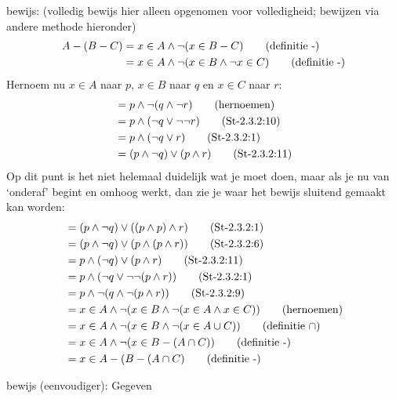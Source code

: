 \begin{answer}
\begin{enumerate}[label=\textit{\alph*.}]
    bewijs: (volledig bewijs hier alleen opgenomen voor volledigheid; bewijzen via andere methode hieronder)\\
    \begin{align}
    A - (B - C) &= x\in A\wedge \neg(x\in B-C)\tag{\text{definitie -}}\\
    &= x\in A\wedge\neg(x\in B\wedge\neg x\in C) \tag{\text{definitie -}}
    \end{align}
    Hernoem nu $x\in A$ naar $p$, $x\in B$ naar $q$ en $x\in C$ naar $r$:
    \begin{align}
    &= p\wedge\neg(q\wedge\neg r)\tag{\text{hernoemen}}\\
    &= p\wedge(\neg q\vee\neg\neg r)\tag{St-2.3.2:10}\\
    &= p\wedge(\neg q\vee r)\tag{St-2.3.2:1}\\
    &=(p\wedge\neg q)\vee(p\wedge r)\tag{St-2.3.2:11}\\
    \end{align}
    Op dit punt is het niet helemaal duidelijk wat je moet doen, maar als je nu van `onderaf' begint en omhoog werkt, dan zie je waar het bewijs sluitend gemaakt kan worden:
    \begin{align}
    &=(p\wedge\neg q)\vee((p\wedge p)\wedge r)\tag{St-2.3.2:1}\\
    &=(p\wedge\neg q)\vee(p\wedge (p\wedge r))\tag{St-2.3.2:6}\\
    &=p\wedge(\neg q)\vee(p\wedge r)\tag{St-2.3.2:11}\\
    &=p\wedge(\neg q\vee\neg\neg (p\wedge r))\tag{St-2.3.2:1}\\
    &=p\wedge\neg(q\wedge\neg(p\wedge r))\tag{St-2.3.2:9}\\
    &=x\in A\wedge\neg(x\in B\wedge\neg (x\in A\wedge x\in C))\tag{\text{hernoemen}}\\
    &=x\in A\wedge\neg(x\in B\wedge\neg (x\in A\cup C))\tag{\text{definitie $\cap$}}\\
    &=x\in A\wedge\neg(x\in B-(A\cap C))\tag{\text{definitie }-}\\
    &=x\in A-(B-(A\cap C)\tag{\text{definitie }-}
    \end{align}
    
    bewijs (eenvoudiger): Gegeven\\
\end{enumerate}
\end{answer}
